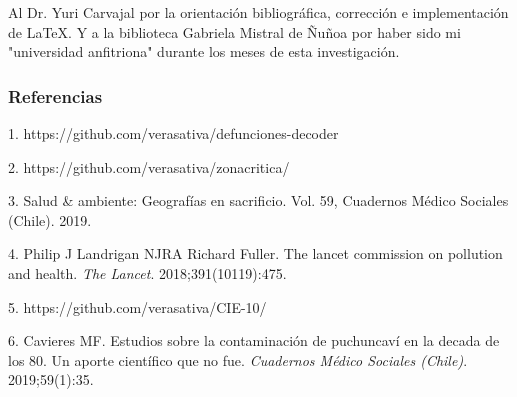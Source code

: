 \documentclass[]{article}
\begin{document}
Al Dr. Yuri Carvajal por la orientación bibliográfica, corrección e implementación de LaTeX. Y a la biblioteca Gabriela Mistral de Ñuñoa por haber sido mi "universidad anfitriona" durante los meses de esta investigación.


\hypertarget{refs}{%
\subsubsection{Referencias}\label{referencias}}

\leavevmode\hypertarget{defunciones-decoder}{}%
1. https://github.com/verasativa/defunciones-decoder

\leavevmode\hypertarget{codigo-fuente}{}%
2. https://github.com/verasativa/zonacritica/

\leavevmode\hypertarget{ref-cms59}{}%
3. Salud \& ambiente: Geografías en sacrificio. Vol. 59, Cuadernos
Médico Sociales (Chile). 2019.

\leavevmode\hypertarget{ref-landrigan2017}{}%
4. Philip J Landrigan NJRA Richard Fuller. The lancet commission on
pollution and health. \emph{The Lancet}. 2018;391(10119):475.

\leavevmode\hypertarget{CIE-10}{}%
5. https://github.com/verasativa/CIE-10/

\leavevmode\hypertarget{ref-cms80s}{}%
6. Cavieres MF. Estudios sobre la contaminación de puchuncaví en la
decada de los 80. Un aporte científico que no fue. \emph{Cuadernos
Médico Sociales (Chile)}. 2019;59(1):35.
\end{document}

